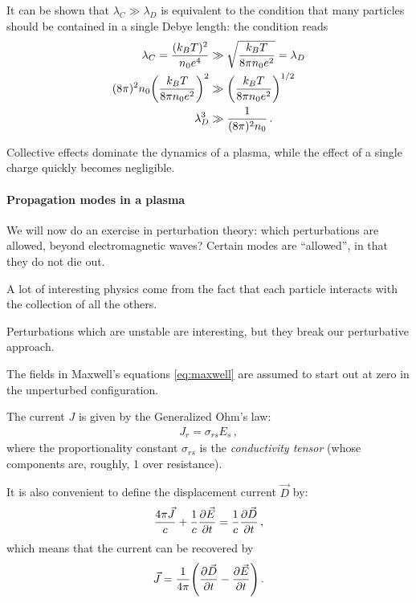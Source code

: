 \documentclass[main.tex]{subfiles}
\begin{document}
\begin{extracontent}
It can be shown that \(\lambda _C \gg \lambda _D\) is equivalent to the condition that many particles should be contained in a single Debye length: the condition reads 
%
\begin{align}
\lambda _C = \frac{(k_B T)^2}{n_0 e^{4}} &\gg \sqrt{\frac{k_B T}{8 \pi n_0 e^2}} = \lambda _D   \\
(8 \pi)^2 n_0 \qty(\frac{k_B T}{8 \pi n_0 e^2})^2 &\gg  \qty( \frac{k_BT}{ 8 \pi n_0 e^2})^{1/2}  \\
\lambda _D^3 &\gg \frac{1}{(8 \pi )^2 n_0 }
\,.
\end{align}
\end{extracontent}

Collective effects dominate the dynamics of a plasma, while the effect of a single charge quickly becomes negligible.

\paragraph{Propagation modes in a plasma}

We will now do an exercise in perturbation theory: which perturbations are allowed, beyond electromagnetic waves? 
Certain modes are ``allowed'', in that they do not die out. 

A lot of interesting physics come from the fact that each particle interacts with the collection of all the others. 

Perturbations which are unstable are interesting, but they break our perturbative approach. 

The fields in Maxwell's equations \eqref{eq:maxwell} are assumed to start out at zero in the unperturbed configuration. 

The current \(J\) is given by the Generalized Ohm's law: 
%
\begin{align}
J_r = \sigma_{rs} E_s 
\,,
\end{align}
%
where the proportionality constant \(\sigma _{rs}\) is the \emph{conductivity tensor} (whose components are, roughly, 1 over resistance).

It is also convenient to define the displacement current \(\vec{D}\) by:
%
\begin{align}
\frac{4 \pi \vec{J}}{c} + \frac{1}{c} \pdv{\vec{E}}{t} = \frac{1}{c} \pdv{\vec{D}}{t}
\,,
\end{align}
%
which means that the current can be recovered by 
%
\begin{align}
\vec{J} = \frac{1}{4 \pi } \qty(\pdv{\vec{D}}{t} - \pdv{\vec{E}}{t})
\,.
\end{align}
\end{document}
